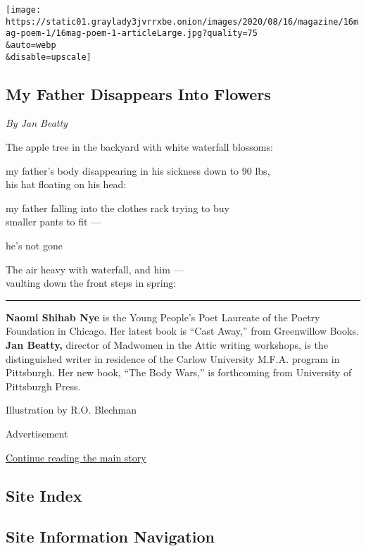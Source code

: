 \texttt{[image: https://static01.graylady3jvrrxbe.onion/images/2020/08/16/magazine/16mag-poem-1/16mag-poem-1-articleLarge.jpg?quality=75\\\&auto=webp\\\&disable=upscale]}

\hypertarget{my-father-disappears-into-flowers}{%
\subsection{My Father Disappears Into
Flowers}\label{my-father-disappears-into-flowers}}

\emph{By Jan Beatty}

The apple tree in the backyard with white waterfall blossoms:

my father's body disappearing in his sickness down to 90 lbs,\\
his hat floating on his head:

my father falling into the clothes rack trying to buy\\
smaller pants to fit ---

he's not gone

The air heavy with waterfall, and him ---\\
vaulting down the front steps in spring:

\begin{center}\rule{0.5\linewidth}{\linethickness}\end{center}

\textbf{Naomi Shihab Nye} is the Young People's Poet Laureate of the
Poetry Foundation in Chicago. Her latest book is ``Cast Away,'' from
Greenwillow Books. \textbf{Jan Beatty,} director of Madwomen in the
Attic writing workshops, is the distinguished writer in residence of the
Carlow University M.F.A. program in Pittsburgh. Her new book, ``The Body
Wars,'' is forthcoming from University of Pittsburgh Press.

Illustration by R.O. Blechman

Advertisement

\protect\hyperlink{after-bottom}{Continue reading the main story}

\hypertarget{site-index}{%
\subsection{Site Index}\label{site-index}}

\hypertarget{site-information-navigation}{%
\subsection{Site Information
Navigation}\label{site-information-navigation}}

